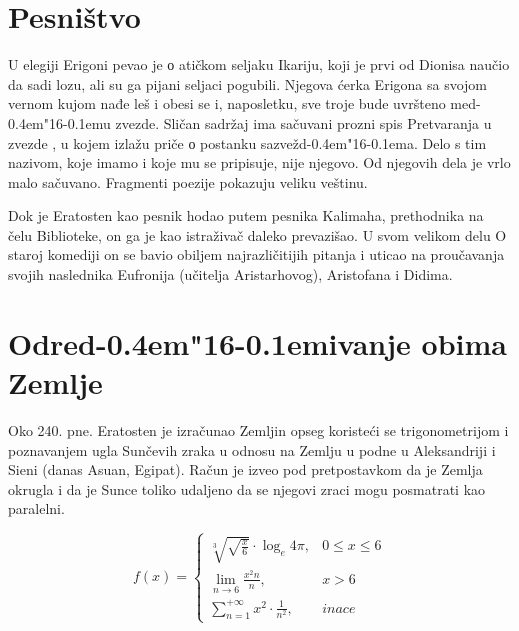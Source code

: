 \documentclass[11pt]{article}
\def\dj{d\kern-0.4em\char"16\kern-0.1em}
\begin{document}
\section{Pesni\v stvo}

\begin{multicols}{2}
U elegiji Erigoni pevao je ο ati\v ckom seljaku Ikariju, koji je prvi od Dionisa nau\v cio da sadi lozu, ali su ga pijani seljaci pogubili. Njegova \' cerka Erigona sa svojom vernom kujom nađe le\v s i obesi se i, naposletku, sve troje bude uvr\v steno me\dj u zvezde. Sli\v can sadr\v zaj ima sa\v cuvani prozni spis Pretvaranja u zvezde , u kojem izla\v zu pri\v ce ο postanku sazve\v z\dj a. Delo s tim nazivom, koje imamo i koje mu se pripisuje, nije njegovo. Od njegovih dela je vrlo malo sa\v cuvano. Fragmenti poezije pokazuju veliku ve\v stinu.

Dok je Eratosten kao pesnik hodao putem pesnika Kalimaha, prethodnika na \v celu Biblioteke, on ga je kao istra\v ziva\v c daleko prevazi\v sao. U svom velikom delu Ο staroj komediji on se bavio obiljem najrazli\v citijih pitanja i uticao na prou\v cavanja svojih naslednika Eufronija (u\v citelja Aristarhovog), Aristofana i Didima.
\end{multicols}

\section{Odre\dj ivanje obima Zemlje}

Oko 240. pne. Eratosten je izra\v cunao Zemljin opseg koriste\' ci se trigonometrijom i poznavanjem ugla Sun\v cevih zraka u odnosu na Zemlju u podne u Aleksandriji i Sieni (danas Asuan, Egipat). Ra\v cun je izveo pod pretpostavkom da je Zemlja okrugla i da je Sunce toliko udaljeno da se njegovi zraci mogu posmatrati kao paralelni.


\newpage
\begin{equation}
f(x) = \left\{
\begin{array}{rl}
\sqrt[3]{\sqrt{\frac{x}{6}}} \cdot \log_{e}{4 \pi} , & 0 \le x \le 6 \\
\lim\limits_{ n \rightarrow 6 } \frac{x^2n}{n} , & x > 6 \\
\sum\limits_{n=1}^{ +\infty} x^2 \cdot \frac{1}{n^2} , & inace
\end{array}
\right.
\end{equation}
\end{document}

